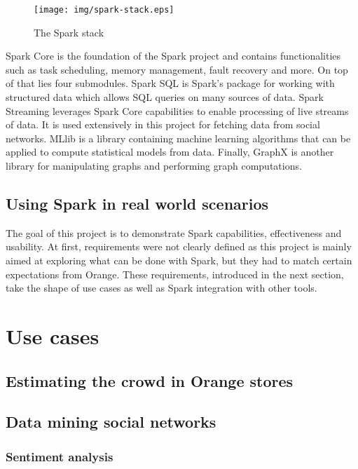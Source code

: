 \documentclass[11pt]{article}
\begin{document}
\begin{figure}[h!]
    \centering
    \texttt{[image: img/spark-stack.eps]}
    \caption{The Spark stack}
    \label{spark-stack}
\end{figure}

Spark Core is the foundation of the Spark project and contains functionalities such as task scheduling, memory management, fault recovery and more. On top of that lies four submodules.
Spark SQL is Spark's package for working with structured data which allows SQL queries on many sources of data.
Spark Streaming leverages Spark Core capabilities to enable processing of live streams of data. It is used extensively in this project for fetching data from social networks.
MLlib is a library containing machine learning algorithms that can be applied to compute statistical models from data.
Finally, GraphX is another library for manipulating graphs and performing graph computations.

\subsection{Using Spark in real world scenarios}
The goal of this project is to demonstrate Spark capabilities, effectiveness and usability. At first, requirements were not clearly defined as this project is mainly aimed at exploring what can be done with Spark, but they had to match certain expectations from Orange. These requirements, introduced in the next section, take the shape of use cases as well as Spark integration with other tools.

\section{Use cases}
\subsection{Estimating the crowd in Orange stores}

\subsection{Data mining social networks}
\subsubsection{Sentiment analysis}
\end{document}
